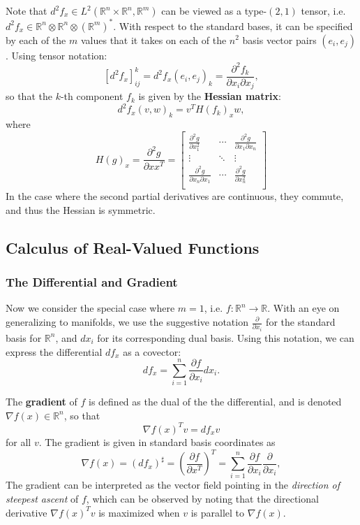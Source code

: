 \documentclass[reqno]{amsart}
\numberwithin{equation}{section}
\begin{document}
Note that $d^2f_x \in L^2(\mathbb R^n \times \mathbb R^n, \mathbb R^m)$ can be viewed as
a type-$(2, 1)$ tensor, i.e. $d^2f_x \in \mathbb R^n \otimes \mathbb R^n \otimes (\mathbb R^m)^*$.
With respect to the standard bases, it can be specified by each of the
$m$ values that it takes on each of the $n^2$ basis vector pairs $(e_i, e_j)$. Using tensor
notation:
$$
    [d^2f_x]_{ij}^k = d^2f_x(e_i,e_j)_k = \frac{\partial^2 f_k}{\partial x_i \partial x_j},
$$
so that the $k$-th component $f_k$ is given by the \textbf{Hessian matrix}:
$$
    d^2f_x(v,w)_k = v^T  H(f_k)_x w,
$$
where
$$
    H(g)_x = \frac{\partial^2 g}{\partial x x^T} =
        \begin{bmatrix} \frac{\partial^2 g}{\partial x_1^2} & \cdots & \frac{\partial^2 g}{\partial x_1 \partial x_n} \\
        \vdots & \ddots & \vdots \\ 
        \frac{\partial^2 g}{\partial x_n \partial x_1} & \cdots & \frac{\partial^2 g}{\partial x_n^2} \\
        \end{bmatrix}
$$
In the case where the second partial derivatives are continuous, they commute, and thus
the Hessian is symmetric.

\subsection{Calculus of Real-Valued Functions}

\subsubsection{The Differential and Gradient}

Now we consider the special case where $m=1$, i.e. $f: \mathbb R^n \to \mathbb R$. With an
eye on generalizing to manifolds, we use the suggestive notation $\frac{\partial}{\partial x_i}$
for the standard basis for $\mathbb R^n$, and $dx_i$ for its corresponding dual basis. Using
this notation, we can express the differential $df_x$ as a covector:
$$
    df_x = \sum_{i=1}^n \frac{\partial f}{\partial x_i} dx_i.
$$

The \textbf{gradient} of $f$ is defined as the dual of the the differential,
and is denoted $\nabla f(x) \in \mathbb R^n$, so that
$$
    \nabla f(x)^Tv = df_x v
$$
for all $v$. The gradient is given in standard basis coordinates as
$$
    \nabla f(x) = (df_x)^{\sharp} = \left(\frac{\partial f}{\partial x^T}\right)^T = \sum_{i=1}^n \frac{\partial f}{\partial x_i} \frac{\partial}{\partial x_i},
$$
The gradient can be interpreted as the vector field pointing in the
\emph{direction of steepest ascent} of $f$, which can be observed by noting that the directional
derivative $\nabla f(x)^T v$ is maximized when $v$ is parallel to $\nabla f(x)$.
\end{document}
